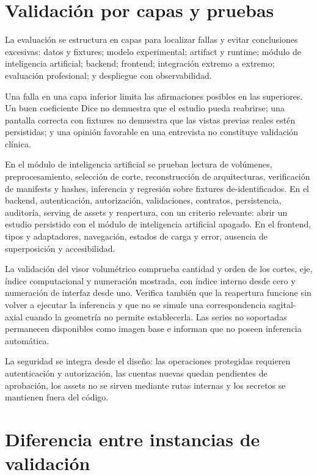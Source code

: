 \section{Validación por capas y pruebas}

La evaluación se estructura en capas para localizar fallas y evitar conclusiones excesivas: datos y fixtures; modelo experimental; artifact y runtime; módulo de inteligencia artificial; backend; frontend; integración extremo a extremo; evaluación profesional; y despliegue con observabilidad.

Una falla en una capa inferior limita las afirmaciones posibles en las superiores. Un buen coeficiente Dice no demuestra que el estudio pueda reabrirse; una pantalla correcta con fixtures no demuestra que las vistas previas reales estén persistidas; y una opinión favorable en una entrevista no constituye validación clínica.

En el módulo de inteligencia artificial se prueban lectura de volúmenes, preprocesamiento, selección de corte, reconstrucción de arquitecturas, verificación de manifests y hashes, inferencia y regresión sobre fixtures de-identificados. En el backend, autenticación, autorización, validaciones, contratos, persistencia, auditoría, serving de assets y reapertura, con un criterio relevante: abrir un estudio persistido con el módulo de inteligencia artificial apagado. En el frontend, tipos y adaptadores, navegación, estados de carga y error, ausencia de superposición y accesibilidad.

La validación del visor volumétrico comprueba cantidad y orden de los cortes, eje, índice computacional y numeración mostrada, con índice interno desde cero y numeración de interfaz desde uno. Verifica también que la reapertura funcione sin volver a ejecutar la inferencia y que no se simule una correspondencia sagital-axial cuando la geometría no permite establecerla. Las series no soportadas permanecen disponibles como imagen base e informan que no poseen inferencia automática.

La seguridad se integra desde el diseño: las operaciones protegidas requieren autenticación y autorización, las cuentas nuevas quedan pendientes de aprobación, los assets no se sirven mediante rutas internas y los secretos se mantienen fuera del código.

\section{Diferencia entre instancias de validación}
\label{sec:metodologia-instancias-validacion}

